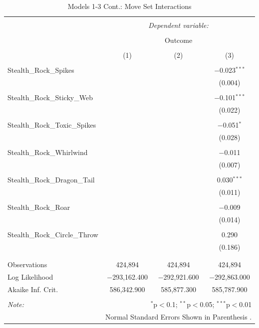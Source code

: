 \documentclass[12pt,twoside]{reedthesis}
\begin{document}
  \begin{table}[!htbp] \centering 
    \caption{Models 1-3 Cont.: Move Set Interactions} 
    \label{} 
  \begin{tabular}{@{\extracolsep{5pt}}lccc} 
  \\[-1.8ex]\hline 
  \hline \\[-1.8ex] 
   & \multicolumn{3}{c}{\textit{Dependent variable:}} \\ 
  \cline{2-4} 
  \\[-1.8ex] & \multicolumn{3}{c}{Outcome} \\ 
  \\[-1.8ex] & (1) & (2) & (3)\\ 
  \hline \\[-1.8ex] 
   Stealth\_Rock\_Spikes &  &  & $-$0.023$^{***}$ \\ 
    &  &  & (0.004) \\ 
    & & & \\ 
   Stealth\_Rock\_Sticky\_Web &  &  & $-$0.101$^{***}$ \\ 
    &  &  & (0.022) \\ 
    & & & \\ 
   Stealth\_Rock\_Toxic\_Spikes &  &  & $-$0.051$^{*}$ \\ 
    &  &  & (0.028) \\ 
    & & & \\ 
   Stealth\_Rock\_Whirlwind &  &  & $-$0.011 \\ 
    &  &  & (0.007) \\ 
    & & & \\ 
   Stealth\_Rock\_Dragon\_Tail &  &  & 0.030$^{***}$ \\ 
    &  &  & (0.011) \\ 
    & & & \\ 
   Stealth\_Rock\_Roar &  &  & $-$0.009 \\ 
    &  &  & (0.014) \\ 
    & & & \\ 
   Stealth\_Rock\_Circle\_Throw &  &  & 0.290 \\ 
    &  &  & (0.186) \\ 
    & & & \\ 
  \hline \\[-1.8ex] 
  Observations & 424,894 & 424,894 & 424,894 \\ 
  Log Likelihood & $-$293,162.400 & $-$292,921.600 & $-$292,863.000 \\ 
  Akaike Inf. Crit. & 586,342.900 & 585,877.300 & 585,787.900 \\ 
  \hline 
  \hline \\[-1.8ex] 
  \textit{Note:}  & \multicolumn{3}{r}{$^{*}$p$<$0.1; $^{**}$p$<$0.05; $^{***}$p$<$0.01} \\ 
   & \multicolumn{3}{r}{Normal Standard Errors Shown in Parenthesis .} \\ 
  \end{tabular} 
  \end{table}
  
\end{document}

